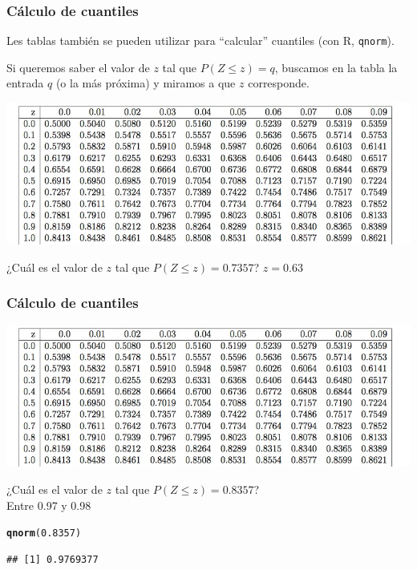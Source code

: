 \documentclass[handout]{beamer}\usepackage[]{graphicx}\usepackage[]{color}
\makeatletter
\newcommand{\hlnum}[1]{\textcolor[rgb]{0.686,0.059,0.569}{#1}}%
\newcommand{\hlstd}[1]{\textcolor[rgb]{0.345,0.345,0.345}{#1}}%
\newcommand{\hlkwd}[1]{\textcolor[rgb]{0.737,0.353,0.396}{\textbf{#1}}}%
\newenvironment{kframe}{%
 \def\at@end@of@kframe{}%
 \ifinner\ifhmode%
  \def\at@end@of@kframe{\end{minipage}}%
  \begin{minipage}{\columnwidth}%
 \fi\fi%
 \def\FrameCommand##1{\hskip\@totalleftmargin \hskip-\fboxsep
 \colorbox{shadecolor}{##1}\hskip-\fboxsep
     \hskip-\linewidth \hskip-\@totalleftmargin \hskip\columnwidth}%
 \MakeFramed {\advance\hsize-\width
   \@totalleftmargin\z@ \linewidth\hsize
   \@setminipage}}%
 {\par\unskip\endMakeFramed%
 \at@end@of@kframe}
\newenvironment{knitrout}{}{} %
\renewcommand{\leq}{\leqslant}
\theoremstyle{plain}
\theoremstyle{definition}
\makeatother
\begin{document}
\begin{frame}
\frametitle{Cálculo de cuantiles}

Les tablas  también  se pueden utilizar para ``calcular'' cuantiles (con R, \texttt{qnorm}).
\medskip

Si queremos saber el valor de $z$ tal que $P(Z\leq z)=q$, buscamos en la tabla la entrada $q$ (o la más próxima)  y  miramos a que $z$ corresponde.
\vspace*{-3ex}

\begin{center}
\hspace*{-0.4cm}\includegraphics[width=1.1\linewidth]{tabla.jpg}
\end{center}
\vspace*{-2ex}

¿Cuál es el valor de  $z$ tal que $P(Z\leq z)=0.7357$? $z=0.63$


\end{frame}

\begin{frame}[fragile]
\frametitle{Cálculo de  cuantiles}
\vspace*{-1cm}


\begin{center}
\hspace*{-0.4cm}\includegraphics[width=1.1\linewidth]{tabla.jpg}
\end{center}
\vspace*{-2ex}

¿Cuál es el valor de  $z$ tal que $P(Z\leq z)=0.8357$?\\ \pause Entre 0.97 y 0.98
\begin{knitrout}
\color{fgcolor}\begin{kframe}
\begin{alltt}
\hlkwd{qnorm}\hlstd{(}\hlnum{0.8357}\hlstd{)}
\end{alltt}
\begin{verbatim}
## [1] 0.9769377
\end{verbatim}
\end{kframe}
\end{knitrout}
\end{frame}
\end{document}
